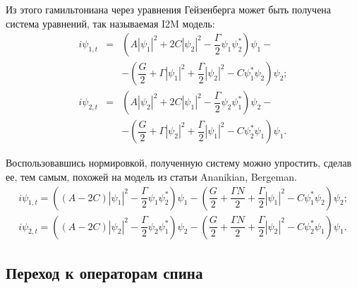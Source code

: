 \documentclass[12pt]{article}
\begin{document}
Из этого гамильтониана через уравнения Гейзенберга может быть получена система уравнений, так называемая I2M модель:
%
\begin{equation}
\begin{array}{lcl}
	i \psi_{1,t} & = & (A |\psi_1|^2 + 2C |\psi_2|^2 - \dfrac{\Gamma}{2} \psi_1 \psi_2^*) \psi_1 - \\[10pt]
	&& - (\dfrac{G}{2} + \Gamma |\psi_1|^2 + \dfrac{\Gamma}{2} |\psi_2|^2 - C \psi_1^* \psi_2) \psi_2; \\[10pt]
	i \psi_{2,t} & = & (A |\psi_2|^2 + 2C |\psi_1|^2 - \dfrac{\Gamma}{2} \psi_2 \psi_1^*) \psi_2 - \\[10pt] 
	&& - (\dfrac{G}{2} + \Gamma |\psi_2|^2 + \dfrac{\Gamma}{2}|\psi_1|^2 - C \psi_2^* \psi_1) \psi_1.
\end{array}
\label{eq:I2M}
\end{equation}
%

Воспользовавшись нормировкой, полученную систему можно упростить, сделав ее, тем самым, похожей на модель из статьи Ananikian, Bergeman.
%
\begin{equation*}
\begin{array}{c}
	i \psi_{1,t} = ((A - 2C) |\psi_1|^2 - \dfrac{\Gamma}{2} \psi_1 \psi_2^*) \psi_1 - (\dfrac{G}{2} + \dfrac{\Gamma N}{2} + \dfrac{\Gamma}{2} |\psi_1|^2 - C \psi_1^* \psi_2) \psi_2; \\[10pt]
	i \psi_{2,t} = ((A - 2C) |\psi_2|^2 - \dfrac{\Gamma}{2} \psi_2 \psi_1^*) \psi_2 - (\dfrac{G}{2} + \dfrac{\Gamma N}{2} + \dfrac{\Gamma}{2} |\psi_2|^2 - C \psi_2^* \psi_1) \psi_1.
\end{array}
\end{equation*}
%

\subsection*{Переход к операторам спина}
\end{document}
